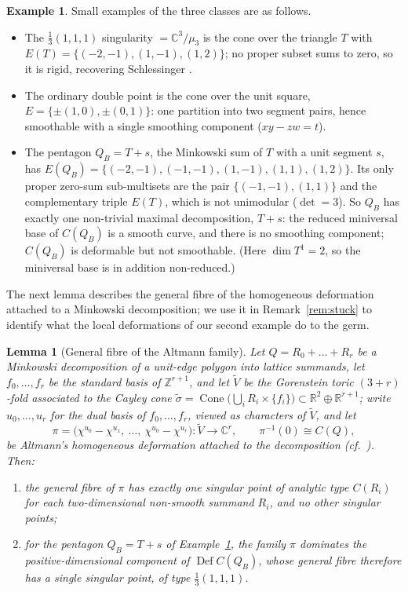\documentclass[11pt]{amsart}
\newtheorem{lemma}[theorem]{Lemma}
\theoremstyle{definition}
\newtheorem{example}[theorem]{Example}
\theoremstyle{remark}
\newcommand{\ZZ}{\mathbb{Z}}
\newcommand{\RR}{\mathbb{R}}
\newcommand{\CC}{\mathbb{C}}
\newcommand{\Def}{\operatorname{Def}}
\begin{document}
\begin{example}\label{ex:pentagon}
Small examples of the three classes are as follows.
\begin{itemize}
\item The $\frac13(1,1,1)$ singularity $=\CC^3/\mu_3$ is the cone over the
triangle $T$ with $E(T)=\{(-2,-1),(1,-1),(1,2)\}$; no proper subset sums to
zero, so it is rigid, recovering Schlessinger \cite{Schlessinger71}.
\item The ordinary double point is the cone over the unit square,
$E=\{\pm(1,0),\pm(0,1)\}$: one partition into two segment pairs, hence
smoothable with a single smoothing component ($xy-zw=t$).
\item The pentagon $Q_B = T + s$, the Minkowski sum of $T$ with a unit segment
$s$, has $E(Q_B)=\{(-2,-1),(-1,-1),(1,-1),(1,1),(1,2)\}$.  Its only proper
zero-sum sub-multisets are the pair $\{(-1,-1),(1,1)\}$ and the complementary
triple $E(T)$, which is not unimodular ($\det = 3$).  So $Q_B$ has exactly one
non-trivial maximal decomposition, $T+s$: the reduced miniversal base of
$C(Q_B)$ is a smooth curve, and there is no smoothing component; $C(Q_B)$
is deformable but not smoothable.  (Here $\dim T^1 = 2$, so the miniversal
base is in addition non-reduced.)
\end{itemize}
\end{example}

The next lemma describes the general fibre of the homogeneous deformation
attached to a Minkowski decomposition; we use it in Remark~\ref{rem:stuck}
to identify what the local deformations of our second example do to the
germ.

\begin{lemma}[General fibre of the Altmann family]\label{lem:cascade}
Let $Q = R_0 + \dots + R_r$ be a Minkowski decomposition of a unit-edge
polygon into lattice summands, let $f_0,\dots,f_r$ be the standard
basis of $\ZZ^{r+1}$, and let $\widetilde V$ be the Gorenstein toric
$(3+r)$-fold associated to the \emph{Cayley cone}
$\widetilde\sigma=\operatorname{Cone}\bigl(\bigcup_{i} R_i\times\{f_i\}\bigr)
\subset \RR^2\oplus\RR^{r+1}$; write $u_0,\dots,u_r$ for the dual basis of
$f_0,\dots,f_r$, viewed as characters of $\widetilde V$, and let
\[
\pi=\bigl(\chi^{u_0}-\chi^{u_1},\ \dots,\ \chi^{u_0}-\chi^{u_r}\bigr)\colon
\widetilde V \longrightarrow \CC^r,
\qquad \pi^{-1}(0)\cong C(Q),
\]
be Altmann's homogeneous deformation attached to the decomposition
\cite{Altmann95} \textup{(}cf.\ \cite[Remark~6.2]{CFP}\textup{)}.  Then:
\begin{enumerate}
\item the general fibre of $\pi$ has exactly one singular point of analytic
type $C(R_i)$ for each two-dimensional non-smooth summand $R_i$, and no
other singular points;
\item for the pentagon $Q_B = T + s$ of
Example~\textup{\ref{ex:pentagon}}, the family $\pi$ dominates the
positive-dimensional component of $\Def C(Q_B)$, whose general fibre
therefore has a single singular point, of type $\frac13(1,1,1)$.
\end{enumerate}
\end{lemma}
\end{document}
